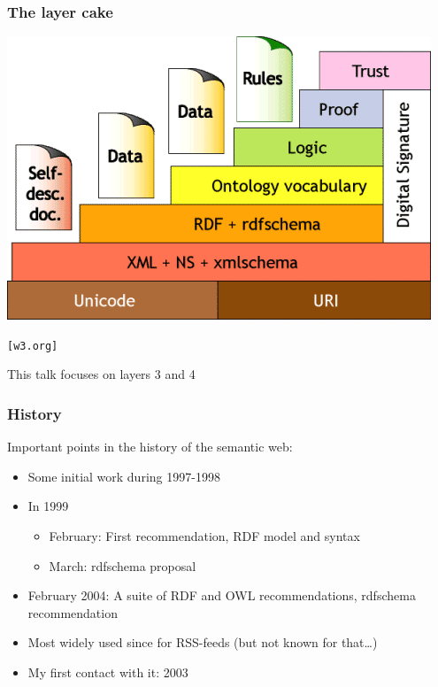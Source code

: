 \documentclass[handout]{beamer}
\begin{document}
        \begin{frame}
            \frametitle{The layer cake}

            \begin{center}
                \includegraphics[scale=0.5]{layercake}
            \end{center}
            \begin{flushright}
                \texttt{[w3.org]}
            \end{flushright}
            This talk focuses on layers 3 and 4 
        \end{frame}

       \begin{frame}
            \frametitle{History}

            Important points in the history of the semantic web:
            \pause
            \vskip 0.7cm

            \begin{itemize}
                \item Some initial work during 1997-1998
                \pause
                \item In 1999
                    \pause
                    \begin{itemize}
                        \item February: First recommendation, RDF model and syntax
                        \pause
                        \item March: rdfschema proposal
                    \end{itemize}
                \pause
                \item February 2004: A suite of RDF and OWL recommendations, rdfschema recommendation
                \pause
                \item Most widely used since for RSS-feeds (but not known for that\ldots)
                \pause
                \item My first contact with it: 2003
            \end{itemize}
        \end{frame}
\end{document}
